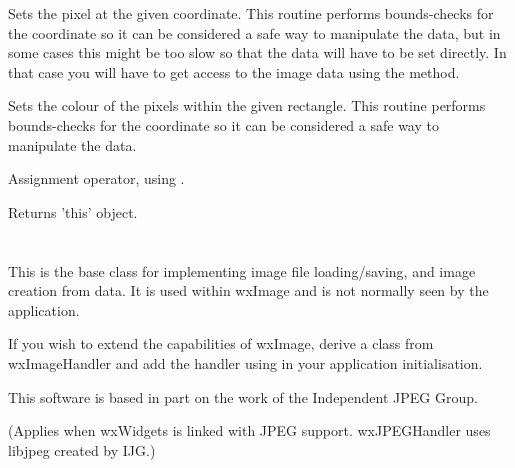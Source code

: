 
Sets the pixel at the given coordinate. This routine performs bounds-checks
for the coordinate so it can be considered a safe way to manipulate the
data, but in some cases this might be too slow so that the data will have to
be set directly. In that case you will have to get access to the image data
using the  method.


\label{wximagesetrgbrect}


Sets the colour of the pixels within the given rectangle. This routine performs
bounds-checks for the coordinate so it can be considered a safe way to manipulate the
data.


\label{wximageassign}


Assignment operator, using .




Returns 'this' object.



\section{}\label{wximagehandler}

This is the base class for implementing image file loading/saving, and image creation from data.
It is used within wxImage and is not normally seen by the application.

If you wish to extend the capabilities of wxImage, derive a class from wxImageHandler
and add the handler using  in your
application initialisation.


This software is based in part on the work of the Independent JPEG Group.

(Applies when wxWidgets is linked with JPEG support. wxJPEGHandler uses libjpeg
created by IJG.)

